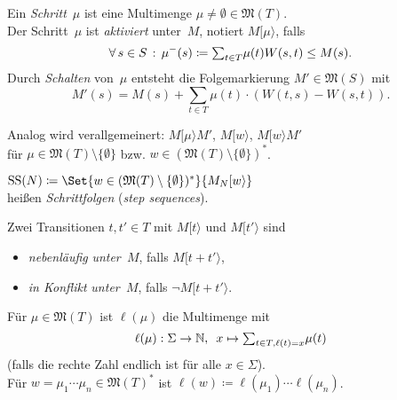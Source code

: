 \documentclass{cheat-sheet}
\newcommand{\activeTransition}[1]{[{#1}\rangle} %
\newcommand{\Markings}{\mathfrak{M}} %
\newcommand{\Multisets}{\mathfrak{M}} %
\DeclareMathOperator{\StepSequences}{SS} %
\begin{document}
\begin{defn}
  Ein \emph{Schritt}~$\mu$ ist eine Multimenge $\mu \neq \emptyset \in \Multisets(T)$. \\
  Der Schritt~$\mu$ ist \emph{aktiviert} unter~$M$, notiert $M \activeTransition{\mu}$, falls
  \[
    \fa{s \in S} \mu^{-}(s) \coloneqq {\sum}_{t \in T} \mu(t) W(s, t) \leq M(s).
  \]
  Durch \textit{Schalten} von~$\mu$ entsteht die Folgemarkierung $M' \in \Markings(S)$ mit
  \[
    M'(s) = M(s) + {\sum}_{t \in T} \mu(t) \cdot (W(t, s) - W(s, t)).
  \]
\end{defn}

\begin{bem}
  \begin{minipage}[t]{0.8 \linewidth}
    Analog wird verallgemeinert:
    $M \activeTransition{\mu} M'$, $M \activeTransition{w}$, $M \activeTransition{w} M'$ \\
    für $\mu \in \Markings(T) \setminus \{ \emptyset \}$ bzw. $w \in (\Markings(T) \setminus \{ \emptyset \})^{*}$.
  \end{minipage}
\end{bem}

\begin{defn}
  \begin{minipage}[t]{0.8 \linewidth}
    $\StepSequences(N) \coloneqq \Set{w \in (\Markings(T) \setminus \{ \emptyset \})^{*}}{M_N \activeTransition{w}}$ \\
    heißen \emph{Schrittfolgen} (\textit{step sequences}).
  \end{minipage}
\end{defn}

\begin{defn}
  Zwei Transitionen $t, t' \in T$ mit $M \activeTransition{t}$ und $M \activeTransition{t'}$ sind
  \begin{itemize}
    \item \emph{nebenläufig} \textit{unter~$M$}, falls $M \activeTransition{t + t'}$,
    \item \emph{in Konflikt} \textit{unter~$M$}, falls $\neg M \activeTransition{t + t'}$.
  \end{itemize}
\end{defn}

\begin{nota}
  Für $\mu \in \Multisets(T)$ ist $\ell(\mu)$ die Multimenge mit
  \[
    \ell(\mu) : \Sigma \to \N, \enspace
    x \mapsto {\sum}_{t \in T, \ell(t) = x} \mu(t)
  \]
  (falls die rechte Zahl endlich ist für alle $x \in \Sigma$). \\
  Für $w = \mu_1 \cdots \mu_n \in \Multisets(T)^{*}$ ist 
  $\ell(w) \coloneqq \ell(\mu_1) \cdots \ell(\mu_n)$.
\end{nota}
\end{document}
